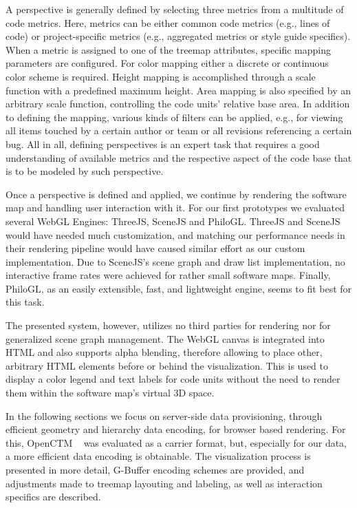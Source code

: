 \documentclass[annual]{acmsiggraph}
\newcommand{\scite}[1]{~\cite{#1}}
\begin{document}
A perspective is generally defined by selecting three metrics from a multitude of code metrics.
Here, metrics can be either common code metrics (e.g., lines of code) or project-specific metrics (e.g., aggregated metrics or style guide specifics).
When a metric is assigned to one of the treemap attributes, specific mapping parameters are configured.
For color mapping either a discrete or continuous color scheme is required.
Height mapping is accomplished through a scale function with a predefined maximum height.
Area mapping is also specified by an arbitrary scale function, controlling the code units' relative base area.
In addition to defining the mapping, various kinds of filters can be applied, e.g., for viewing all items touched by a certain author or team or all revisions referencing a certain bug.
All in all, defining perspectives is an expert task that requires a good understanding of available metrics and the respective aspect of the code base that is to be modeled by such perspective.

Once a perspective is defined and applied, we continue by rendering the software map and handling user interaction with it.
For our first prototypes we evaluated several WebGL Engines: ThreeJS, SceneJS and PhiloGL.
ThreeJS and SceneJS would have needed much customization, and matching our performance needs in their rendering pipeline would have caused similar effort as our custom implementation.
Due to SceneJS's scene graph and draw list implementation, no interactive frame rates were achieved for rather small software maps.
Finally, PhiloGL, as an easily extensible, fast, and lightweight engine, seems to fit best for this task.

The presented system, however, utilizes no third parties for rendering nor for generalized scene graph management. 
The WebGL canvas is integrated into HTML and also supports alpha blending, therefore allowing to place other, arbitrary HTML elements before or behind the visualization.
This is used to display a color legend and text labels for code units without the need to render them within the software map's virtual 3D space.

In the following sections we focus on server-side data provisioning, through efficient geometry and hierarchy data encoding, for browser based rendering.
For this, OpenCTM \scite{OpenCTM2013} was evaluated as a carrier format, but, especially for our data, a more efficient data encoding is obtainable.
The visualization process is presented in more detail, G-Buffer encoding schemes are provided, and adjustments made to treemap layouting and labeling, as well as interaction specifics are described.
\end{document}

